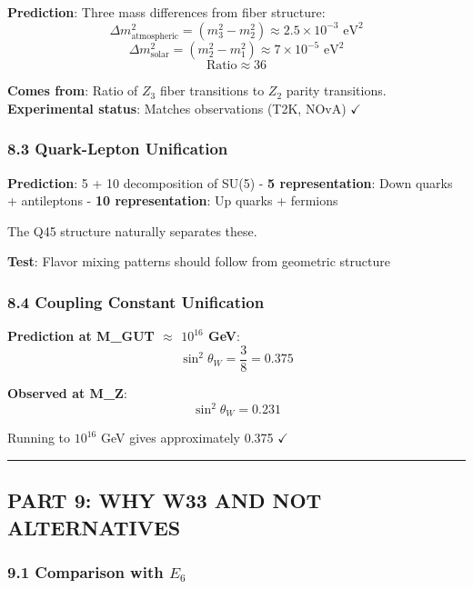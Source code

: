 \documentclass[11pt]{article}
\begin{document}
\textbf{Prediction}: Three mass differences from fiber structure:
\[\Delta m_{\text{atmospheric}}^2 = (m_3^2 - m_2^2) \approx 2.5 \times 10^{-3} \text{ eV}^2\]
\[\Delta m_{\text{solar}}^2 = (m_2^2 - m_1^2) \approx 7 \times 10^{-5} \text{ eV}^2\]
\[\text{Ratio} \approx 36\]

\textbf{Comes from}: Ratio of \(Z_{3}\) fiber transitions to \(Z_{2}\)
parity transitions. \textbf{Experimental status}: Matches observations
(T2K, NOvA) \ensuremath{\checkmark}

\subsubsection{8.3 Quark-Lepton
Unification}\label{quark-lepton-unification}

\textbf{Prediction}: 5 + 10 decomposition of SU(5) - \textbf{5
representation}: Down quarks + antileptons - \textbf{10 representation}:
Up quarks + fermions

The Q45 structure naturally separates these.

\textbf{Test}: Flavor mixing patterns should follow from geometric
structure

\subsubsection{8.4 Coupling Constant
Unification}\label{coupling-constant-unification}

\textbf{Prediction at M\_GUT \ensuremath{\approx} \(10^{16}\) GeV}:
\[\sin^2 \theta_W = \frac{3}{8} = 0.375\]

\textbf{Observed at M\_Z}: \[\sin^2 \theta_W = 0.231\]

Running to \(10^{16}\) GeV gives approximately 0.375
\ensuremath{\checkmark}

\begin{center}\rule{0.5\linewidth}{0.5pt}\end{center}

\subsection{PART 9: WHY W33 AND NOT
ALTERNATIVES}\label{part-9-why-w33-and-not-alternatives}

\subsubsection{\texorpdfstring{9.1 Comparison with
\(E_{6}\)}{9.1 Comparison with E\_\{6\}}}\label{comparison-with-e_6}
\end{document}
